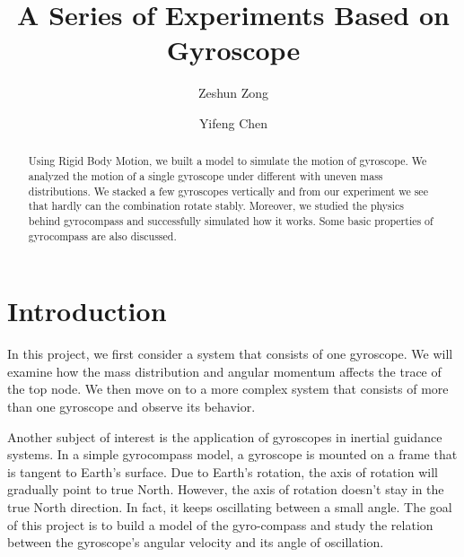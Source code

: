 \documentclass[12pt]{article}
\renewcommand{\(}{\left (}
\renewcommand{\)}{\right )}
\begin{document}
\title{A Series of Experiments Based on Gyroscope}
\date{}
\author[1]{Zeshun Zong}
\author[2]{Yifeng Chen}


\maketitle
\begin{abstract}
Using Rigid Body Motion, we built a model to simulate the motion of gyroscope. We analyzed the motion of a single gyroscope under different with uneven mass distributions. We stacked a few gyroscopes vertically and from our experiment we see that hardly can the combination rotate stably. Moreover, we studied the physics behind gyrocompass and successfully simulated how it works. Some basic properties of gyrocompass are also discussed.
\end{abstract}

\section{Introduction}

\hspace{5mm} In this project, we first consider a system that consists of one gyroscope. We will examine how the mass distribution and angular momentum affects the trace of the top node. We then move on to a more complex system that consists of more than one gyroscope and observe its behavior.

Another subject of interest is the application of gyroscopes in inertial guidance systems. In a simple gyrocompass model, a gyroscope is mounted on a frame that is tangent to Earth's surface. Due to Earth's rotation, the axis of rotation will gradually point to true North. However, the axis of rotation doesn't stay in the true North direction. In fact, it keeps oscillating between a small angle. The goal of this project is to build a model of the gyro-compass and study the relation between the gyroscope's angular velocity and its angle of oscillation.
\end{document}
